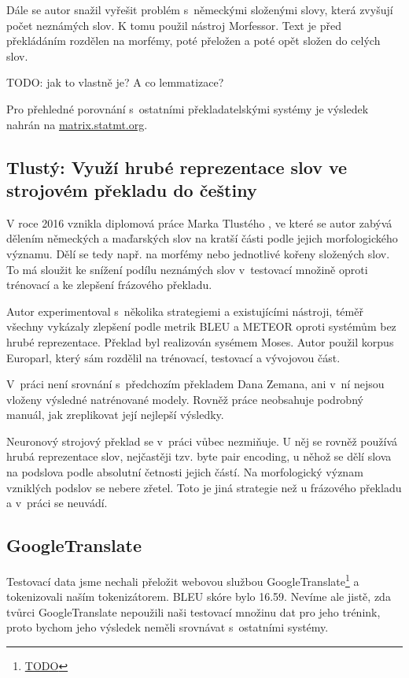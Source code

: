 \documentclass[a4]{article}
\def\furl#1{\footnote{\url{#1}}}
\begin{document}
Dále se autor snažil vyřešit problém s~německými složenými slovy, která
zvyšují počet neznámých slov. K tomu použil nástroj
Morfessor\cite{morfessor}. Text je před překládáním rozdělen na morfémy,
poté přeložen a poté opět složen do celých slov.

TODO: jak to vlastně je? A co lemmatizace?

Pro přehledné porovnání s~ostatními překladatelskými systémy je výsledek
nahrán na \url{matrix.statmt.org}.

\subsection{Tlustý: Využí hrubé reprezentace slov ve strojovém
překladu do češtiny}

V roce 2016 vznikla diplomová práce Marka Tlustého \cite{tlusty}, ve které se autor
zabývá dělením německých a maďarských slov na kratší části podle jejich
morfologického významu. Dělí se tedy např. na morfémy nebo jednotlivé kořeny
složených slov. To má sloužit ke snížení podílu neznámých slov v~testovací
množině oproti trénovací a ke zlepšení frázového překladu. 

Autor experimentoval s~několika strategiemi a existujícími nástroji, téměř
všechny vykázaly zlepšení podle metrik BLEU a METEOR oproti systémům bez
hrubé reprezentace.  Překlad byl realizován sysémem Moses. Autor použil
korpus Europarl\cite{europarl}, který sám rozdělil na trénovací, testovací a vývojovou
část. 

V~práci není srovnání s~předchozím překladem Dana Zemana, ani v~ní nejsou
vloženy výsledné natrénované modely. Rovněž práce neobsahuje podrobný manuál, jak
zreplikovat její nejlepší výsledky.

Neuronový strojový překlad se v~práci vůbec nezmiňuje. 
U něj se rovněž používá hrubá reprezentace slov, nejčastěji
tzv. byte pair encoding, u něhož se dělí slova na podslova podle absolutní četnosti jejich
částí. Na morfologický význam vzniklých podslov se nebere zřetel. Toto je
jiná strategie než u frázového překladu a v~práci se neuvádí. 


\subsection{GoogleTranslate}


Testovací data jsme nechali přeložit webovou službou
GoogleTranslate\furl{TODO} a tokenizovali naším tokenizátorem. BLEU skóre
bylo 16.59. Nevíme ale jistě, zda tvůrci GoogleTranslate nepoužili naši
testovací množinu dat pro jeho trénink, proto bychom jeho výsledek neměli
srovnávat s~ostatními systémy.
\end{document}

